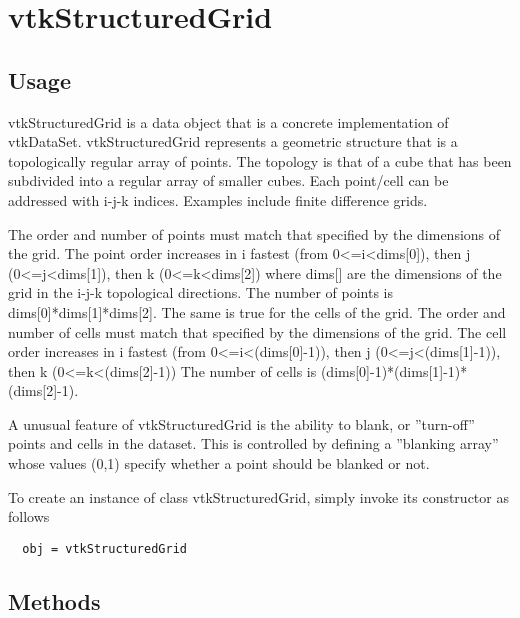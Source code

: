 \section{vtkStructuredGrid}

\subsection{Usage}

 vtkStructuredGrid is a data object that is a concrete implementation of
 vtkDataSet. vtkStructuredGrid represents a geometric structure that is a
 topologically regular array of points. The topology is that of a cube that
 has been subdivided into a regular array of smaller cubes. Each point/cell
 can be addressed with i-j-k indices. Examples include finite difference 
 grids.

 The order and number of points must match that specified by the dimensions
 of the grid. The point order increases in i fastest (from 0<=i<dims[0]),
 then j (0<=j<dims[1]), then k (0<=k<dims[2]) where dims[] are the
 dimensions of the grid in the i-j-k topological directions. The number of
 points is dims[0]*dims[1]*dims[2]. The same is true for the cells of the
 grid. The order and number of cells must match that specified by the
 dimensions of the grid. The cell order increases in i fastest (from
 0<=i<(dims[0]-1)), then j (0<=j<(dims[1]-1)), then k (0<=k<(dims[2]-1))
 The number of cells is (dims[0]-1)*(dims[1]-1)*(dims[2]-1).
 
 A unusual feature of vtkStructuredGrid is the ability to blank, 
 or ''turn-off'' points and cells in the dataset. This is controlled by 
 defining a ''blanking array'' whose values (0,1) specify whether
 a point should be blanked or not.

To create an instance of class vtkStructuredGrid, simply
invoke its constructor as follows
\begin{verbatim}
  obj = vtkStructuredGrid
\end{verbatim}
\subsection{Methods}

